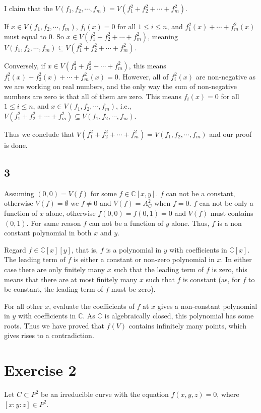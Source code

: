 \documentclass{article}
\theoremstyle{definition}
\theoremstyle{definition}
\theoremstyle{remark}
\newcommand{\bb}[1]{\mathbb{#1}} %
\begin{document}
I claim that the $V(f_1, f_2, \cdots, f_m) = V(f_1^2 + f_2^2 + \cdots + f_m^2)$.

If $x \in V(f_1, f_2, \cdots, f_m)$, $f_i(x) = 0$ for all $ 1 \leq i \leq n$, and $f_1^2(x) + \cdots + f_m^2(x)$ must equal to $0$. 
So $x \in V(f_1^2 + f_2^2 + \cdots + f_m^2)$, meaning $V(f_1, f_2, \cdots, f_m) \subseteq V(f_1^2 + f_2^2 + \cdots + f_m^2)$.

Conversely, if $x \in V(f_1^2 + f_2^2 + \cdots + f_m^2)$, this means $f_1^2(x) + f_2^2(x) + \cdots + f_m^2(x) = 0$. 
However, all of $f_i^2(x)$ are non-negative as we are working on real numbers, and the only way the sum of non-negative numbers are zero is that all of them are zero. 
This means $f_i(x) = 0$ for all $1 \leq i \leq n$, and $x \in V(f_1, f_2, \cdots, f_m)$, i.e., $V(f_1^2 + f_2^2 + \cdots + f_m^2) \subseteq V(f_1, f_2, \cdots, f_m)$.

Thus we conclude that $V(f_1^2 + f_2^2 + \cdots + f_m^2) = V(f_1, f_2, \cdots, f_m)$ and our proof is done.

\subsection*{3}

Assuming $(0, 0) = V(f)$ for some $f \in \bb{C}[x,y]$. 
$f$ can not be a constant, otherwise $V(f) = \emptyset$ we $f \neq 0$ and $V(f) = A_C^2$ when $f = 0$.
$f$ can not be only a function of $x$ alone, otherwise $f(0, 0) = f(0, 1) = 0$ and $V(f)$ must contains $(0, 1)$. 
For same reason $f$ can not be a function of $y$ alone.
Thus, $f$ is a non constant polynomial in both $x$ and $y$.

Regard $f \in \bb{C}[x] [y]$, that is, $f$ is a polynomial in $y$ with coefficients in $\bb{C}[x]$. 
The leading term of $f$ is either a constant or non-zero polynomial in $x$. 
In either case there are only finitely many $x$ such that the leading term of $f$ is zero, this means that there are at most finitely many $x$ such that $f$ is constant (as, for $f$ to be constant, the leading term of $f$ must be zero).

For all other $x$, evaluate the coefficients of $f$ at $x$ gives a non-constant polynomial in $y$ with coefficients in $\bb{C}$.
As $\bb{C}$ is algebraically closed, this polynomial has some roots. Thus we have proved that $f(V)$ contains infinitely many points, which gives rises to a contradiction.
 
\section*{Exercise 2}
Let $C \subset P^2$ be an irreducible curve with the equation $f(x, y, z) = 0$, where $[x : y : z] \in P^2$.
\end{document}
